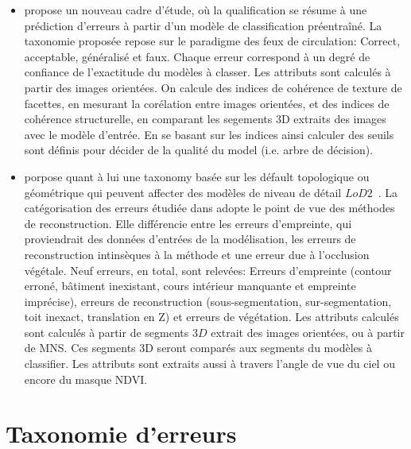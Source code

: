 \documentclass[a4paper,french]{article}
\begin{document}
    \begin{itemize}
        \item \cite{Boudet2006} propose un nouveau cadre d'étude, où la qualification se résume à une prédiction d'erreurs à partir d'un modèle de classification préentraîné. La taxonomie proposée repose sur le paradigme des feux de circulation: Correct, acceptable, généralisé et faux. Chaque erreur correspond à un degré de confiance de l'exactitude du modèles à classer. Les attributs sont calculés à partir des images orientées. On calcule des indices de cohérence de texture de facettes, en mesurant la corélation entre images orientées, et des indices de cohérence structurelle, en comparant les segements 3D extraits des images avec le modèle d'entrée. En se basant sur les indices ainsi calculer des seuils sont définis pour décider de la qualité du model (i.e. arbre de décision).
        \item \cite{Michelin2013} porpose quant à lui une taxonomy basée sur les défault topologique ou géométrique qui peuvent affecter des modèles de niveau de détail $LoD2$~\cite{kolbe2005citygml}. La catégorisation des erreurs étudiée dans \cite{Michelin2013} adopte le point de vue des méthodes de reconstruction. Elle différencie entre les erreurs d'empreinte, qui proviendrait des données d'entrées de la modélisation, les erreurs de reconstruction intinsèques à la méthode et une erreur due à l'occlusion végétale. Neuf erreurs, en total, sont relevées: Erreurs d'empreinte (contour erroné, bâtiment inexistant, cours intérieur manquante et empreinte imprécise), erreurs de reconstruction (sous-segmentation, sur-segmentation, toit inexact, translation en Z) et erreurs de végétation. Les attributs calculés sont calculés à partir de segments $3D$ extrait des images orientées, ou à partir de MNS. Ces segments 3D seront comparés aux segments du modèles à classifier. Les attributs sont extraits aussi à travers l'angle de vue du ciel ou encore du masque NDVI.
    \end{itemize}

    \section{Taxonomie d'erreurs}
\end{document}
